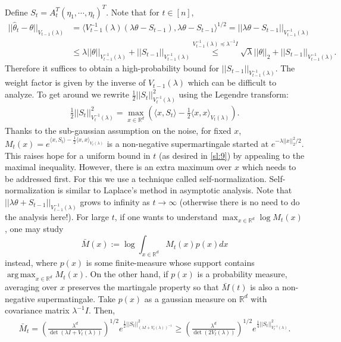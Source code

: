 \documentclass[letterpaper,11pt,openright,openany]{book}
\numberwithin{equation}{section}
\theoremstyle{plain}
\theoremstyle{definition}
\def\R{{\mathbb R}}
\def\R{{\mathbb R}}
\def\t{{\theta}}
\DeclareMathOperator*{\argmax}{arg\,max}
\begin{document}
Define $S_t = A_{t}^T(\eta_1, \cdots, \eta_t)^T$. Note that for $t\in [n]$, 
\begin{align}
||\hat{\t}_t -\t||_{V_{t-1}(\lambda)}&=\langle V^{-1}_{t-1}(\lambda)(\lambda\t - S_{t-1}), \lambda\t - S_{t-1}\rangle^{1/2}\nonumber= ||\lambda\t - S_{t-1} ||_{V^{-1}_{t-1}(\lambda)}\\
&\leq  \lambda ||\t||_{V^{-1}_{t-1}(\lambda)} + ||S_{t-1} ||_{V^{-1}_{t-1}(\lambda)}\stackrel{V^{-1}_{t-1}(\lambda)\preccurlyeq\lambda^{-1}I}{\leq} \sqrt{\lambda} ||\t||_2 + ||S_{t-1} ||_{V^{-1}_{t-1}(\lambda)}\label{sl:12}. 
\end{align}
Therefore it suffices to obtain a high-probability bound for $||S_{t-1} ||_{V^{-1}_{t-1}(\lambda)}$. The weight factor  is given by the inverse of $V_{t-1}(\lambda)$ which can be difficult to analyze. To get around we rewrite $\frac{1}{2}||S_t||^2_{V^{-1}_{t}(\lambda)}$ using the Legendre transform:
\begin{align*}
\frac{1}{2}||S_t ||^2_{V^{-1}_{t}(\lambda)} = \max_{x\in\R^d}\left(\langle x, S_t\rangle - \frac{1}{2}\langle x, x\rangle_{V_t(\lambda)}\right).
\end{align*}
Thanks to the sub-gaussian assumption on the noise, for fixed $x$, $M_t(x)=e^{\langle x, S_t\rangle - \frac{1}{2}\langle x, x\rangle_{V_t(\lambda)}}$ is a non-negative supermartingale started at $e^{-\lambda ||x||_2^2/2}$. This raises hope for a uniform bound in $t$ (as desired in \eqref{sl:9}) by appealing to the maximal inequality. However, there is an extra maximum over $x$ which needs to be addressed first. For this we use a technique called self-normalization. Self-normalization is similar to Laplace's method in asymptotic analysis.  
Note that $||\lambda\t + S_{t-1} ||_{V^{-1}_{t-1}(\lambda)}$ grows to infinity as $t\to\infty$ (otherwise there is no need to do the analysis here!).  For large $t$, if one wants to understand $\max_{x\in\R^d}\log M_t(x)$, one may study $$\bar{M}(x):=\log\int_{x\in\R^d}M_t(x)p(x)dx$$ instead, where $p(x)$ is some finite-measure whose support contains $\argmax_{x\in\R^d} M_t(x)$. 
On the other hand, if $p(x)$ is a probability measure, averaging over $x$ preserves the martingale property so that $\bar{M}(t)$ is also a non-negative supermatingale. Take $p(x)$ as a gaussian measure on $\R^d$ with covariance matrix $\lambda^{-1} I$. Then,
\begin{align*}
\bar{M}_t = \left(\frac{\lambda^d}{\det (\lambda I+V_t(\lambda))}\right)^{1/2}e^{\frac{1}{2}||S_t||^2_{(\lambda I+V_t(\lambda))^{-1}}}\geq  \left(\frac{\lambda^d}{\det (2V_t(\lambda))}\right)^{1/2}e^{\frac{1}{4}||S_t||^2_{V^{-1}_t(\lambda)}}.
\end{align*}
\end{document}

